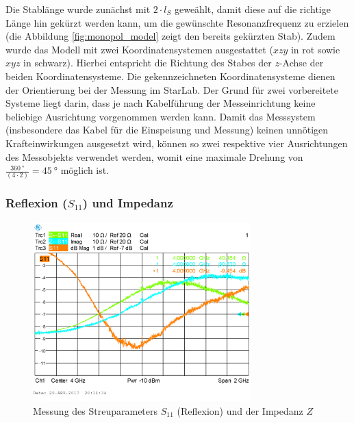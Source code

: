 Die Stablänge wurde zunächst mit $2 \cdot l_S$ geweählt, damit diese auf die
richtige Länge hin gekürzt werden kann, um die gewünschte Resonanzfrequenz
zu erzielen (die Abbildung \ref{fig:monopol_model} zeigt den bereits gekürzten
Stab). Zudem wurde das Modell mit zwei Koordinatensystemen ausgestattet
($xzy$ in rot sowie $xyz$ in schwarz). Hierbei entspricht die Richtung des
Stabes der $z$-Achse der beiden Koordinatensysteme. 
Die gekennzeichneten Koordinatensysteme dienen der Orientierung bei der
Messung im StarLab. Der Grund für zwei vorbereitete Systeme liegt darin,
dass je nach Kabelführung der Messeinrichtung keine beliebige Ausrichtung
vorgenommen werden kann. Damit das Messsystem (insbesondere das Kabel für
die Einspeisung und Messung) keinen unnötigen Krafteinwirkungen ausgesetzt
wird, können so zwei respektive vier Ausrichtungen des Messobjekts verwendet
werden, womit eine maximale Drehung von
$\frac{\SI{360}{\degree}}{(4 \cdot 2)} = \SI{45}{\degree}$ möglich ist.




\clearpage
\subsubsection{Reflexion ($S_{11}$) und Impedanz}

\begin{figure}[h!]
	\centering
	\includegraphics[width=0.75\textwidth]{../data/measurement/T2.png}
	\caption{Messung des Streuparameters $S_{11}$ (Reflexion) und der Impedanz $Z$}
\end{figure}


